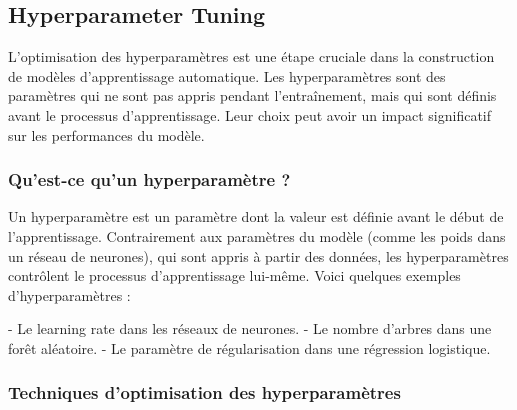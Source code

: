 \documentclass[10pt,a4paper]{article}
\begin{document}
\subsection*{Hyperparameter Tuning}

L'optimisation des hyperparamètres est une étape cruciale dans la construction de modèles d'apprentissage automatique. Les hyperparamètres sont des paramètres qui ne sont pas appris pendant l'entraînement, mais qui sont définis avant le processus d'apprentissage. Leur choix peut avoir un impact significatif sur les performances du modèle.

\subsubsection*{Qu'est-ce qu'un hyperparamètre ?}

Un hyperparamètre est un paramètre dont la valeur est définie avant le début de l'apprentissage. Contrairement aux paramètres du modèle (comme les poids dans un réseau de neurones), qui sont appris à partir des données, les hyperparamètres contrôlent le processus d'apprentissage lui-même. Voici quelques exemples d'hyperparamètres :

- Le learning rate dans les réseaux de neurones.
- Le nombre d'arbres dans une forêt aléatoire.
- Le paramètre de régularisation dans une régression logistique.

\subsubsection*{Techniques d'optimisation des hyperparamètres}
\end{document}

